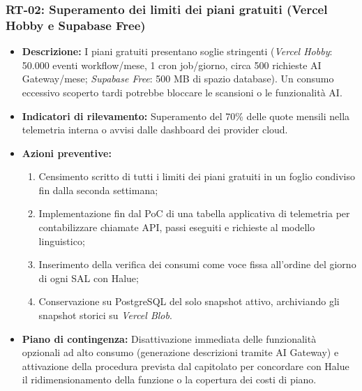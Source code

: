 \subsubsection{RT-02: Superamento dei limiti dei piani gratuiti (Vercel Hobby e Supabase Free)}
\begin{itemize}
    \item \textbf{Descrizione:} I piani gratuiti presentano soglie stringenti (\textit{Vercel Hobby}: 50.000 eventi workflow/mese, 1 cron job/giorno, circa 500 richieste AI Gateway/mese; \textit{Supabase Free}: 500 MB di spazio database). Un consumo eccessivo scoperto tardi potrebbe bloccare le scansioni o le funzionalità AI.
    \item \textbf{Indicatori di rilevamento:} Superamento del 70\% delle quote mensili nella telemetria interna o avvisi dalle dashboard dei provider cloud.
    \item \textbf{Azioni preventive:}
    \begin{enumerate}
        \item Censimento scritto di tutti i limiti dei piani gratuiti in un foglio condiviso fin dalla seconda settimana;
        \item Implementazione fin dal PoC di una tabella applicativa di telemetria per contabilizzare chiamate API, passi eseguiti e richieste al modello linguistico;
        \item Inserimento della verifica dei consumi come voce fissa all'ordine del giorno di ogni SAL con Halue;
        \item Conservazione su PostgreSQL del solo snapshot attivo, archiviando gli snapshot storici su \textit{Vercel Blob}.
    \end{enumerate}
    \item \textbf{Piano di contingenza:} Disattivazione immediata delle funzionalità opzionali ad alto consumo (generazione descrizioni tramite AI Gateway) e attivazione della procedura prevista dal capitolato per concordare con Halue il ridimensionamento della funzione o la copertura dei costi di piano.
\end{itemize}

